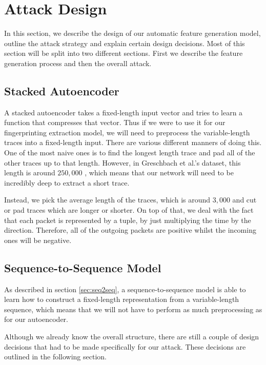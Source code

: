 \chapter{Attack Design}

In this section, we describe the design of our automatic feature generation model, outline the attack strategy and explain certain design decisions.
Most of this section will be split into two different sections.
First we describe the feature generation process and then the overall attack.

\section{Stacked Autoencoder}

A stacked autoencoder takes a fixed-length input vector and tries to learn a function that compresses that vector.
Thus if we were to use it for our fingerprinting extraction model, we will need to preprocess the variable-length traces into a fixed-length input.
There are various different manners of doing this.
One of the most naive ones is to find the longest length trace and pad all of the other traces up to that length.
However, in Greschbach et al.'s dataset, this length is around $250,000$ \cite{greschbach2016effect}, which means that our network will need to be incredibly deep to extract a short trace.

Instead, we pick the average length of the traces, which is around $3,000$ and cut or pad traces which are longer or shorter.
On top of that, we deal with the fact that each packet is represented by a tuple, by just multiplying the time by the direction.
Therefore, all of the outgoing packets are positive whilst the incoming ones will be negative.

\section{Sequence-to-Sequence Model}

As described in section \ref{sec:seq2seq}, a sequence-to-sequence model is able to learn how to construct a fixed-length representation from a variable-length sequence, which means that we will not have to perform as much preprocessing as for our autoencoder.

Although we already know the overall structure, there are still a couple of design decisions that had to be made specifically for our attack.
These decisions are outlined in the following section.

